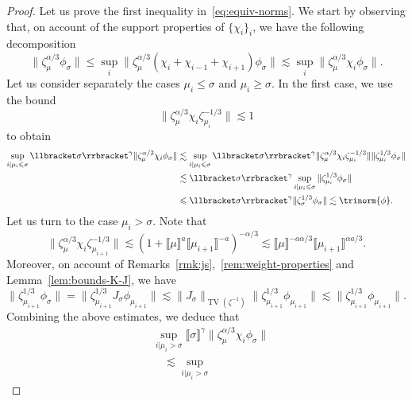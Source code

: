 \documentclass{article}
\numberwithin{equation}{section}
\theoremstyle{plain}
\theoremstyle{definition}
\begin{document}
\begin{proof}
  Let us prove the first inequality in~\eqref{eq:equiv-norms}. We start by
  observing that, on account of the support properties of $\{ \chi_i \}_i$, we
  have the following decomposition
  \[ \| \zeta_{\mu}^{\alpha / 3} \phi_{\sigma} \| \leqslant \sup_i \|
     \zeta_{\mu}^{\alpha / 3} (\chi_i + \chi_{i - 1} + \chi_{i + 1})
     \phi_{\sigma} \| \lesssim \sup_i \| \zeta_{\mu}^{\alpha / 3} \chi_i
     \phi_{\sigma} \| . \]
  Let us consider separately the cases $\mu_i \leqslant \sigma$ and $\mu_i
  \geqslant \sigma$. In the first case, we use the bound
  \[ \| \zeta_{\mu}^{\alpha / 3} \chi_i
     \zeta_{\mu_i}^{- 1 / 3} \| \lesssim 1 \]
  to obtain
  \begin{align*}
    \sup_{i | \mu_i \leqslant \sigma} \llbracket \sigma \rrbracket^{\gamma} 
     \| \zeta_{\mu}^{\alpha / 3} \chi_i \phi_{\sigma} \|
     &\lesssim \sup_{i | \mu_i \leqslant \sigma}
     \llbracket \sigma \rrbracket^{\gamma}
     \| \zeta_{\mu}^{\alpha / 3} \chi_i \zeta_{\mu_i}^{- 1 / 3} \|
     \| \zeta^{1 / 3}_{\mu_i} \phi_{\sigma} \|\\
     &\lesssim \llbracket \sigma \rrbracket^{\gamma}
     \sup_{i | \mu_i \leqslant \sigma}  \| \zeta^{1 / 3}_{\mu_i}
     \phi_{\sigma} \|\\
     &\leqslant \llbracket \sigma \rrbracket^{\gamma}
     \| \zeta^{1 / 3}_{\sigma} \phi_{\sigma} \|
     \lesssim \trinorm{ \phi } .
  \end{align*}
  Let us turn to the case $\mu_i > \sigma$. Note that
  \[ \| \zeta_{\mu}^{\alpha / 3} \chi_i \zeta_{\mu_{i +
     1}}^{- 1 / 3} \| \lesssim (1 + \llbracket \mu \rrbracket^a \llbracket
     \mu_{i + 1} \rrbracket^{- a})^{- \alpha / 3} \lesssim
     \llbracket \mu \rrbracket^{- a \alpha / 3}  \llbracket
     \mu_{i + 1} \rrbracket^{\alpha a / 3} . \]
  Moreover, on account of Remarks~\ref{rmk:js},~\ref{rem:weight-properties}
  and Lemma~\ref{lem:bounds-K-J}, we have
  \[ \| \zeta_{\mu_{i + 1}}^{1 / 3} \phi_{\sigma} \| = \| \zeta_{\mu_{i +
     1}}^{1 / 3} J_{\sigma} \phi_{\mu_{i + 1}} \| \lesssim \| J_{\sigma}
     \|_{\operatorname{TV} (\zeta ^{- 1})}  \| \zeta_{\mu_{i + 1}}^{1 / 3}
     \phi_{\mu_{i + 1}} \| \lesssim \| \zeta_{\mu_{i + 1}}^{1 / 3}
     \phi_{\mu_{i + 1}} \| . \]
  Combining the above estimates, we deduce that
  \begin{align*}
    &\sup_{i | \mu_i > \sigma} \llbracket \sigma \rrbracket^{\gamma}
    \| \zeta_{\mu}^{\alpha / 3} \chi_i \phi_{\sigma} \|\\
    &\quad \lesssim  \sup_{i | \mu_i > \sigma}

\end{align*}
\end{proof}
\end{document}
